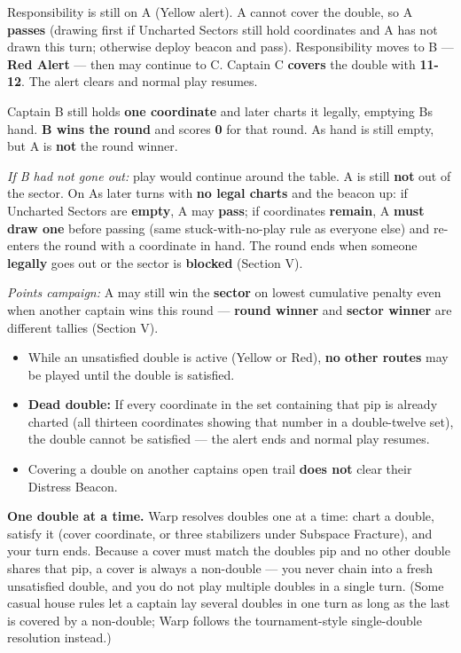\documentclass[11pt]{article}
\providecommand{\tightlist}{%
  \setlength{\itemsep}{0pt}\setlength{\parskip}{0pt}}
\begin{document}
Responsibility is still on A (Yellow alert). A cannot cover the double, so A
\textbf{passes} (drawing first if Uncharted Sectors still hold
coordinates and A has not drawn this turn; otherwise deploy beacon and pass).
Responsibility moves to B --- \textbf{Red Alert} --- then may continue to C.
Captain C \textbf{covers} the double with \textbf{11-12}. The alert clears
and normal play resumes.

Captain B still holds \textbf{one coordinate} and later charts it legally,
emptying B\textquotesingle s hand. \textbf{B wins the round} and scores
\textbf{0} for that round. A\textquotesingle s hand is still empty, but
A is \textbf{not} the round winner.

\emph{If B had not gone out:} play would continue around the table. A is
still \textbf{not} out of the sector. On A\textquotesingle s later turns
with \textbf{no legal charts} and the beacon up: if Uncharted Sectors
are \textbf{empty}, A may \textbf{pass}; if coordinates \textbf{remain}, A
\textbf{must draw one} before passing (same stuck-with-no-play rule as
everyone else) and re-enters the round with a coordinate in hand. The round
ends when someone \textbf{legally} goes out or the sector is
\textbf{blocked} (Section V).

\emph{Points campaign:} A may still win the \textbf{sector} on lowest
cumulative penalty even when another captain wins this round ---
\textbf{round winner} and \textbf{sector winner} are different tallies
(Section V).

\begin{itemize}
\tightlist
\item
  While an unsatisfied double is active (Yellow or Red), \textbf{no other
  routes} may be played until the double is satisfied.
\item
  \textbf{Dead double:} If every coordinate in the set containing that pip is
  already charted (all thirteen coordinates showing that number in a
  double-twelve set), the double cannot be satisfied --- the alert ends
  and normal play resumes.
\item
  Covering a double on another captain\textquotesingle s open trail
  \textbf{does not} clear their Distress Beacon.
\end{itemize}

\textbf{One double at a time.} Warp resolves doubles one at a time:
chart a double, satisfy it (cover coordinate, or three stabilizers under
Subspace Fracture), and your turn ends. Because a cover must match the
double\textquotesingle s pip and no other double shares that pip, a
cover is always a non-double --- you never chain into a fresh unsatisfied
double, and you do not play multiple doubles in a single turn. (Some casual
house rules let a captain lay several doubles in one turn as long as the
last is covered by a non-double; Warp follows the tournament-style
single-double resolution instead.)
\end{document}
